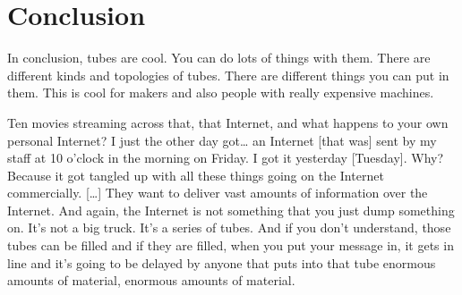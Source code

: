 \section{Conclusion}
In conclusion, tubes are cool.  You can do lots of things with them.  There are different kinds and topologies of tubes.  There are different things you can put in them.  This is cool for makers and also people with really expensive machines.

Ten movies streaming across that, that Internet, and what happens to your own personal Internet? I just the other day got… an Internet [that was] sent by my staff at 10 o'clock in the morning on Friday. I got it yesterday [Tuesday]. Why? Because it got tangled up with all these things going on the Internet commercially.
[…] They want to deliver vast amounts of information over the Internet. And again, the Internet is not something that you just dump something on. It's not a big truck. It's a series of tubes. And if you don't understand, those tubes can be filled and if they are filled, when you put your message in, it gets in line and it's going to be delayed by anyone that puts into that tube enormous amounts of material, enormous amounts of material.
